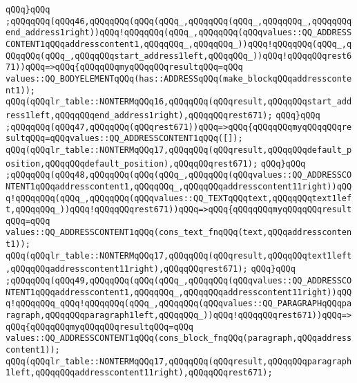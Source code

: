 \verb|qQQq}qQQq|\newline
\verb|;qQQqqQQq(qQQq46,qQQqqQQq(qQQq(qQQq_,qQQqqQQq(qQQq_,qQQqqQQq_,qQQqqQQqend_address1right))qQQq!qQQqqQQq(qQQq_,qQQqqQQq(qQQqvalues::QQ_ADDRESSCONTENT1qQQqaddresscontent1,qQQqqQQq_,qQQqqQQq_))qQQq!qQQqqQQq(qQQq_,qQQqqQQq(qQQq_,qQQqqQQqstart_address1left,qQQqqQQq_))qQQq!qQQqqQQqrest671))qQQq=>qQQq{qQQqqQQqmyqQQqqQQqresultqQQq=qQQq|\newline
\verb|values::QQ_BODYELEMENTqQQq(has::ADDRESSqQQq(make_blockqQQqaddresscontent1));|\newline
\verb|qQQq(qQQqlr_table::NONTERMqQQq16,qQQqqQQq(qQQqresult,qQQqqQQqstart_address1left,qQQqqQQqend_address1right),qQQqqQQqrest671);|\newline
\verb|qQQq}qQQq|\newline
\verb|;qQQqqQQq(qQQq47,qQQqqQQq(qQQqrest671))qQQq=>qQQq{qQQqqQQqmyqQQqqQQqresultqQQq=qQQqvalues::QQ_ADDRESSCONTENT1qQQq([]);|\newline
\verb|qQQq(qQQqlr_table::NONTERMqQQq17,qQQqqQQq(qQQqresult,qQQqqQQqdefault_position,qQQqqQQqdefault_position),qQQqqQQqrest671);|\newline
\verb|qQQq}qQQq|\newline
\verb|;qQQqqQQq(qQQq48,qQQqqQQq(qQQq(qQQq_,qQQqqQQq(qQQqvalues::QQ_ADDRESSCONTENT1qQQqaddresscontent1,qQQqqQQq_,qQQqqQQqaddresscontent11right))qQQq!qQQqqQQq(qQQq_,qQQqqQQq(qQQqvalues::QQ_TEXTqQQqtext,qQQqqQQqtext1left,qQQqqQQq_))qQQq!qQQqqQQqrest671))qQQq=>qQQq{qQQqqQQqmyqQQqqQQqresultqQQq=qQQq|\newline
\verb|values::QQ_ADDRESSCONTENT1qQQq(cons_text_fnqQQq(text,qQQqaddresscontent1));|\newline
\verb|qQQq(qQQqlr_table::NONTERMqQQq17,qQQqqQQq(qQQqresult,qQQqqQQqtext1left,qQQqqQQqaddresscontent11right),qQQqqQQqrest671);|\newline
\verb|qQQq}qQQq|\newline
\verb|;qQQqqQQq(qQQq49,qQQqqQQq(qQQq(qQQq_,qQQqqQQq(qQQqvalues::QQ_ADDRESSCONTENT1qQQqaddresscontent1,qQQqqQQq_,qQQqqQQqaddresscontent11right))qQQq!qQQqqQQq_qQQq!qQQqqQQq(qQQq_,qQQqqQQq(qQQqvalues::QQ_PARAGRAPHqQQqparagraph,qQQqqQQqparagraph1left,qQQqqQQq_))qQQq!qQQqqQQqrest671))qQQq=>qQQq{qQQqqQQqmyqQQqqQQqresultqQQq=qQQq|\newline
\verb|values::QQ_ADDRESSCONTENT1qQQq(cons_block_fnqQQq(paragraph,qQQqaddresscontent1));|\newline
\verb|qQQq(qQQqlr_table::NONTERMqQQq17,qQQqqQQq(qQQqresult,qQQqqQQqparagraph1left,qQQqqQQqaddresscontent11right),qQQqqQQqrest671);|\newline
